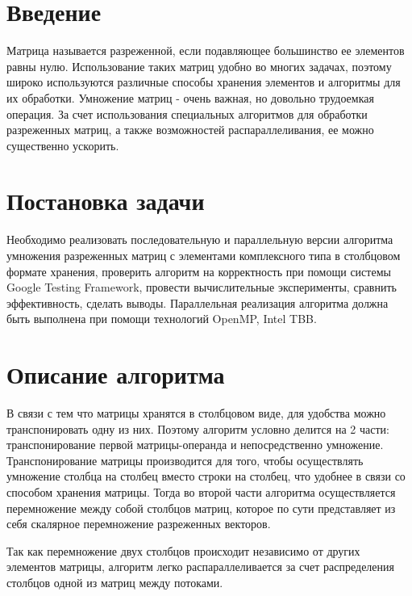 \documentclass{report}
\begin{document}
\setcounter{page}{2}

\tableofcontents
\newpage

\section*{Введение}
\par Матрица называется разреженной, если подавляющее большинство ее элементов равны нулю. Использование таких матриц удобно во многих задачах, поэтому широко используются различные способы хранения элементов и алгоритмы для их обработки. Умножение матриц - очень важная, но довольно трудоемкая операция. За счет использования специальных алгоритмов для обработки разреженных матриц, а также возможностей распараллеливания, ее можно существенно ускорить.
\newpage

\section*{Постановка задачи}
\par Необходимо реализовать последовательную и параллельную версии алгоритма умножения разреженных матриц с элементами комплексного типа в столбцовом формате хранения, проверить алгоритм на корректность при помощи системы Google Testing Framework, провести вычислительные эксперименты, сравнить эффективность, сделать выводы. Параллельная реализация алгоритма должна быть выполнена при помощи технологий OpenMP, Intel TBB.
\newpage

\section*{Описание алгоритма}
\par В связи с тем что матрицы хранятся в столбцовом виде, для удобства можно транспонировать одну из них. Поэтому алгоритм условно делится на 2 части: транспонирование первой матрицы-операнда и непосредственно умножение. Транспонирование матрицы производится для того, чтобы осуществлять умножение столбца на столбец вместо строки на столбец, что удобнее в связи со способом хранения матрицы. Тогда во второй части алгоритма осуществляется перемножение между собой столбцов матриц, которое по сути представляет из себя скалярное перемножение разреженных векторов.

\par Так как перемножение двух столбцов происходит независимо от других элементов матрицы, алгоритм легко распараллеливается за счет распределения столбцов одной из матриц между потоками.
\end{document}
